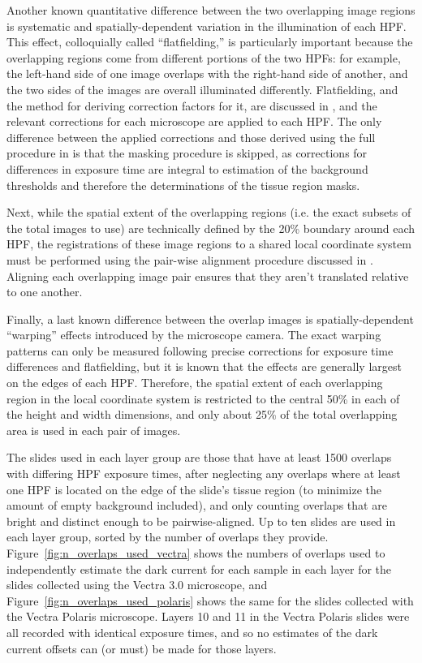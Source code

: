 \documentclass[letterpaper,11pt]{article}
\newcommand{\reffig}[1]{Figure~\ref{#1}}
\begin{document}
Another known quantitative difference between the two overlapping image regions is systematic and spatially-dependent variation in the illumination of each HPF. This effect, colloquially called ``flatfielding,'' is particularly important because the overlapping regions come from different portions of the two HPFs: for example, the left-hand side of one image overlaps with the right-hand side of another, and the two sides of the images are overall illuminated differently. Flatfielding, and the method for deriving correction factors for it, are discussed in \cite{flatfielding_note}, and the relevant corrections for each microscope are applied to each HPF. The only difference between the applied corrections and those derived using the full procedure in \cite{flatfielding_note} is that the masking procedure is skipped, as corrections for differences in exposure time are integral to estimation of the background thresholds and therefore the determinations of the tissue region masks.

Next, while the spatial extent of the overlapping regions (i.e. the exact subsets of the total images to use) are technically defined by the 20\% boundary around each HPF, the registrations of these image regions to a shared local coordinate system must be performed using the pair-wise alignment procedure discussed in \cite{Heshy}. Aligning each overlapping image pair ensures that they aren't translated relative to one another.

Finally, a last known difference between the overlap images is spatially-dependent ``warping'' effects introduced by the microscope camera. The exact warping patterns can only be measured following precise corrections for exposure time differences and flatfielding, but it is known that the effects are generally largest on the edges of each HPF. Therefore, the spatial extent of each overlapping region in the local coordinate system is restricted to the central 50\% in each of the height and width dimensions, and only about 25\% of the total overlapping area is used in each pair of images.


The slides used in each layer group are those that have at least 1500 overlaps with differing HPF exposure times, after neglecting any overlaps where at least one HPF is located on the edge of the slide's tissue region (to minimize the amount of empty background included), and only counting overlaps that are bright and distinct enough to be pairwise-aligned. Up to ten slides are used in each layer group, sorted by the number of overlaps they provide. \reffig{fig:n_overlaps_used_vectra} shows the numbers of overlaps used to independently estimate the dark current for each sample in each layer for the slides collected using the Vectra 3.0 microscope, and \reffig{fig:n_overlaps_used_polaris} shows the same for the slides collected with the Vectra Polaris microscope. Layers 10 and 11 in the Vectra Polaris slides were all recorded with identical exposure times, and so no estimates of the dark current offsets can (or must) be made for those layers. 
\end{document}
